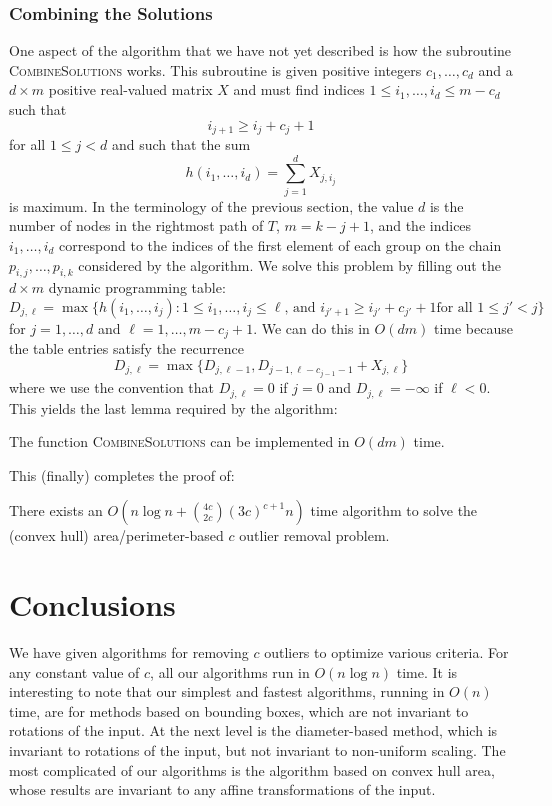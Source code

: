 \documentclass{elsart}
\newcommand{\runtime}{n\log n + {4c\choose 2c}(3c)^{c+1}n}
\newcommand{\Oruntime}{O\left(\runtime\right)}
\begin{document}
\subsubsection{Combining the Solutions}

One aspect of the algorithm that we have not yet described is how the
subroutine \textsc{CombineSolutions} works.  This subroutine is given
positive integers $c_1,\ldots,c_d$ and a $d\times m$ positive
real-valued matrix $X$ and must find 
indices $1\le i_1,\ldots,i_d \le m-c_d$ such that
\[
     i_{j+1} \ge i_j + c_j + 1
\]
for all $1\le j < d$ and such that the sum
\[
      h(i_1,\ldots,i_d)=\sum_{j=1}^d X_{j,i_j}
\]
is maximum.  In the terminology of the previous section, the value $d$
is the number of nodes in the rightmost path of $T$, $m=k-j+1$, and
the indices
$i_1,\ldots,i_d$ correspond to the indices of the
first element of each group on the chain $p_{i,j},\ldots,p_{i,k}$
considered by the algorithm.
We solve this problem by filling out the $d\times m$ dynamic
programming table:
\[
     D_{j,\ell} = \max\{h(i_1,\ldots,i_j):
      \mbox{$1\le i_1,\ldots,i_j\le \ell$, and $i_{j'+1} \ge i_{j'}+c_{j'}+1$
             for all $1\le j'< j$}  \} 
\]
for $j=1,\ldots,d$ and $\ell=1,\ldots,m-c_j+1$.  We can do this in
$O(dm)$ time because the table entries satisfy the recurrence
\[
     D_{j,\ell} = \max\{D_{j,\ell-1},D_{j-1,\ell-c_{j-1}-1}+X_{j,\ell} \}
\]
where we use the convention that $D_{j,\ell} = 0$ if $j=0$ and
$D_{j,\ell}=-\infty$ if $\ell<0$.  This yields the last lemma required
by the algorithm:

\begin{lem}
The function \textsc{CombineSolutions} can be implemented in
$O(dm)$ time.
\end{lem}

This (finally) completes the proof of:
\begin{thm}
There exists an 
$\Oruntime$ time
algorithm to solve
the (convex hull) area/perimeter-based $c$ outlier removal problem.
\end{thm}

\section{Conclusions}

We have given algorithms for removing $c$ outliers to optimize various
criteria. For any constant value of $c$, all our algorithms run in
$O(n\log n)$ time.  It is interesting to note that our simplest and
fastest algorithms, running in $O(n)$ time, are for methods based on
bounding boxes, which are not invariant to rotations of the input.  At
the next level is the diameter-based method, which is invariant to
rotations of the input, but not invariant to non-uniform scaling.  The
most complicated of our algorithms is the algorithm based on convex
hull area, whose results are invariant to any affine transformations
of the input.
\end{document}
